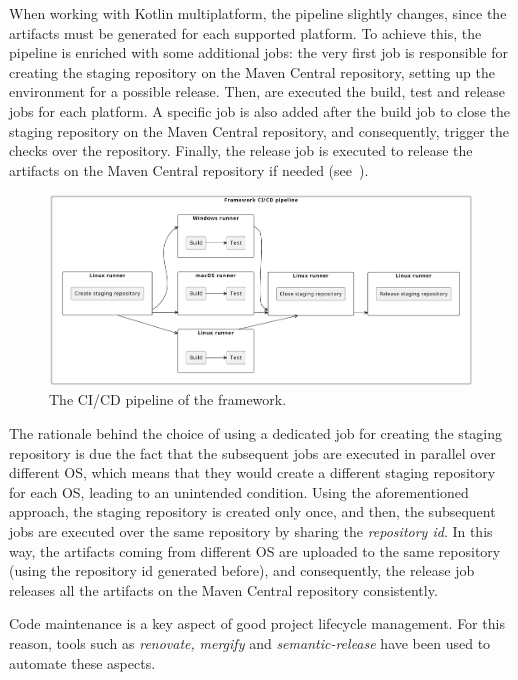 When working with Kotlin multiplatform, the pipeline slightly changes, since the artifacts must be generated for each supported platform.
To achieve this, the pipeline is enriched with some additional jobs: the very first job is responsible for creating the staging repository on the
Maven Central repository, setting up the environment for a possible release. Then, are executed the build, test and release jobs for each platform.
A specific job is also added after the build job to close the staging repository on the Maven Central repository, and consequently, trigger the
checks over the repository. Finally, the release job is executed to release the artifacts on the Maven Central repository if needed
(see~).

\begin{figure}[ht]
	\centering
	\includegraphics[width=\textwidth]{figures/framework-ci.pdf}
	\caption{The CI/CD pipeline of the framework.}
	\label{fig:ci-cd-pipeline}
\end{figure}

The rationale behind the choice of using a dedicated job for creating the staging repository is due the fact that the subsequent jobs are executed
in parallel over different OS, which means that they would create a different staging repository for each OS, leading to an unintended condition.
Using the aforementioned approach, the staging repository is created only once, and then, the subsequent jobs are executed over the same repository
by sharing the \emph{repository id}. In this way, the artifacts coming from different OS are uploaded to the same repository (using the repository id
generated before), and consequently, the release job releases all the artifacts on the Maven Central repository consistently.

Code maintenance is a key aspect of good project lifecycle management.
For this reason, tools such as \emph{renovate,} \emph{mergify} and \emph{semantic-release} have been used to automate these aspects.

